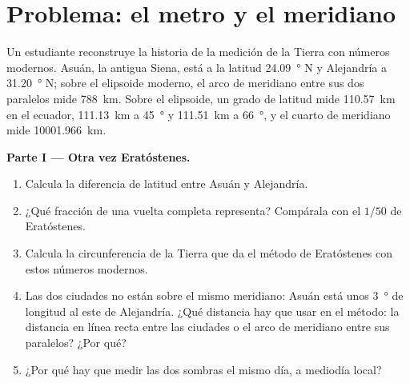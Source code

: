 \section{Problema: el metro y el meridiano}

\begin{problem}
\label{pb:g10:measuring-the-earth:1}
Un estudiante reconstruye la historia de la medición de la Tierra con
números modernos. Asuán, la antigua Siena, está a la latitud
\qty{24.09}{\degree} N y Alejandría a \qty{31.20}{\degree} N; sobre el
elipsoide moderno, el arco de meridiano entre sus dos paralelos mide
\qty{788}{km}. Sobre el elipsoide, un grado de latitud mide
\qty{110.57}{km} en el ecuador, \qty{111.13}{km} a \qty{45}{\degree} y
\qty{111.51}{km} a \qty{66}{\degree}, y el cuarto de meridiano mide
\qty{10001.966}{km}.

\medskip
\noindent\textbf{Parte I --- Otra vez Eratóstenes.}
\begin{enumerate}
  \item Calcula la diferencia de latitud entre Asuán y Alejandría.
  \item ¿Qué fracción de una vuelta completa representa? Compárala con el
        $1/50$ de Eratóstenes.
  \item Calcula la circunferencia de la Tierra que da el método de
        Eratóstenes con estos números modernos.
  \item Las dos ciudades no están sobre el mismo meridiano: Asuán está unos
        \qty{3}{\degree} de longitud al este de Alejandría. ¿Qué distancia
        hay que usar en el método: la distancia en línea recta entre las
        ciudades o el arco de meridiano entre sus paralelos? ¿Por qué?
  \item ¿Por qué hay que medir las dos sombras el mismo día, a mediodía
        local?
\end{enumerate}


\end{problem}

